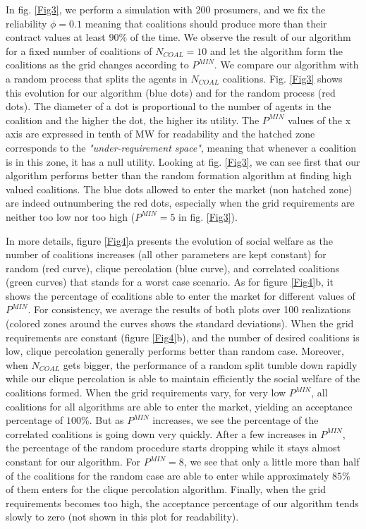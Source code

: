 \documentclass[conference]{IEEEtran}
\begin{document}
In fig. \ref{Fig3}, we perform a simulation with 200 prosumers, and we fix the reliability $ \phi = 0.1 $ meaning that coalitions should produce more than their contract values at least $ 90 \% $ of the time. We observe the result of our algorithm for a fixed number of coalitions of $N_{COAL} = 10$ and let the algorithm form the coalitions as the grid changes according to $ P^{MIN} $. We compare our algorithm with a random process that splits the agents in $ N_{COAL} $ coalitions. Fig. \ref{Fig3} shows this evolution for our algorithm (blue dots) and for the random process (red dots). The diameter of a dot is proportional to the number of agents in the coalition and the higher the dot, the higher its utility. The $ P^{MIN} $ values of the x axis are expressed in tenth of MW for readability and the hatched zone corresponds to the \textit{"under-requirement space"}, meaning that whenever a coalition is in this zone, it has a null utility. Looking at fig. \ref{Fig3}, we can see first that our algorithm performs better than the random formation algorithm at finding high valued coalitions. The blue dots allowed to enter the market (non hatched zone) are indeed outnumbering the red dots, especially when the grid requirements are neither too low nor too high ($ P^{MIN} = 5 $ in fig. \ref{Fig3}).

In more details, figure \ref{Fig4}a presents the evolution of social welfare as the number of coalitions increases (all other parameters are kept constant) for random (red curve), clique percolation (blue curve), and correlated coalitions (green curves) that stands for a worst case scenario. As for figure \ref{Fig4}b, it shows the percentage of coalitions able to enter the market for different values of $ P^{MIN} $. For consistency, we average the results of both plots over 100 realizations (colored zones around the curves shows the standard deviations). When the grid requirements are constant (figure \ref{Fig4}b), and the number of desired coalitions is low, clique percolation generally performs better than random case. Moreover, when $ N_{COAL} $ gets bigger, the performance of a random split tumble down rapidly while our clique percolation is able to maintain efficiently the social welfare of the coalitions formed. When the grid requirements vary, for very low $ P^{MIN} $, all coalitions for all algorithms are able to enter the market, yielding an acceptance percentage of $ 100 \% $. But as $ P^{MIN} $ increases, we see the percentage of the correlated coalitions is going down very quickly. After a few increases in $ P^{MIN} $, the percentage of the random procedure starts dropping while it stays almost constant for our algorithm. For $ P^{MIN} = 8 $, we see that only a little more than half of the coalitions for the random case are able to enter while approximately $ 85 \%$ of them enters for the clique percolation algorithm. Finally, when the grid requirements becomes too high, the acceptance percentage of our algorithm tends slowly to zero (not shown in this plot for readability).
\end{document}
